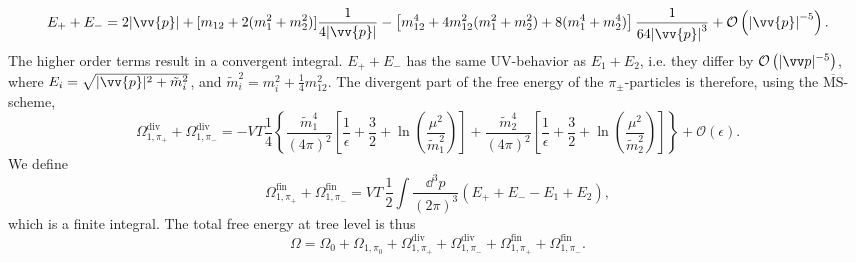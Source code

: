 \begin{equation}
    E_+ + E_-
    = 2  \abs{\vv{p}}
    + [m_{12} + 2(m_1^2 + m_2^2)]\frac{1}{4 \abs{\vv{p}}}
    - \left[ m_{12}^4 + 4 m_{12}^2(m_1^2 + m_2^2) + 8(m_1^4 + m_2^4) \right] \frac{1}{64 \abs{\vv{p}}^3}
    + \Oh[-5]{ \abs{\vv{p}}}.
\end{equation}
The higher order terms result in a convergent integral.
$E_+ + E_-$ has the same UV-behavior as $E_1 + E_2$, i.e. they differ by  $\Oh[-5]{|\vv p|}$, where $E_i = \sqrt{|\vv{p}|^2 + \tilde m_i^2}$, and $\tilde m_i^2 = m_i^2 + \frac{1}{4} m_{12}^2$. 
The divergent part of the free energy of the $\pi_\pm$-particles is therefore, using the $\mathrm{\overline{MS}}$-scheme, 
\begin{equation}
    \Omega^{\mathrm{div}}_{1, \pi_+} + \Omega^{\mathrm{div}}_{1, \pi_-}
    = 
    - VT \frac{1}{4}
    \left\{
        \frac{\tilde m_1^4}{(4\pi)^2} 
        \left[
            \frac{1}{\epsilon} + \frac{3}{2} + \ln(\frac{\mu^2}{\tilde m_1^2}) 
        \right]
        +
        \frac{\tilde m_2^4}{(4\pi)^2} 
        \left[
            \frac{1}{\epsilon} + \frac{3}{2} + \ln(\frac{\mu^2}{\tilde m_2^2})
        \right] 
    \right\} 
    + \mathcal{O}(\epsilon).
\end{equation}
We define
\begin{equation}
    \Omega^{\mathrm{fin}}_{1, \pi_+} + \Omega^{\mathrm{fin}}_{1, \pi_-}
    = 
    V T \, \frac{1}{2} \int \frac{\dd^3 p}{(2\pi)^3} (E_+ + E_- - E_1 + E_2),
\end{equation}
which is a finite integral.
The total free energy at tree level is thus
\begin{equation}
    \Omega = \Omega_0 
    + \Omega_{1, \pi_0} 
    + \Omega^{\mathrm{div}}_{1, \pi_+} + \Omega^{\mathrm{div}}_{1, \pi_-}
    + \Omega^{\mathrm{fin}}_{1, \pi_+} + \Omega^{\mathrm{fin}}_{1, \pi_-}.
\end{equation}
